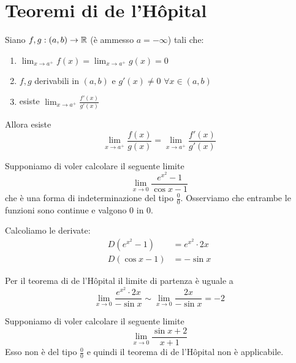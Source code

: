 \section{Teoremi di de l'Hôpital}

\begin{theorem}
Siano $f, g : (a,b) \to \mathbb R$ (è ammesso $a = -\infty$) tali che:
\begin{enumerate}
\item $\lim_{x \to a^+} f(x) = \lim_{x \to a^+} g(x) = 0$
\item $f,g$ derivabili in $(a,b)$ e $g'(x) \neq 0$ $\forall x \in (a,b)$
\item esiste $\lim_{x \to a^+} \frac{f'(x)}{g'(x)}$
\end{enumerate}

Allora esiste
\begin{equation*}
\lim_{x \to a^+} \frac{f(x)}{g(x)} = \lim_{x \to a^+} \frac{f'(x)}{g'(x)}
\end{equation*}
\end{theorem}

\begin{example}
Supponiamo di voler calcolare il seguente limite
\begin{equation*}
\lim_{x \to 0} \frac{e^{x^2}-1}{\cos x -1}
\end{equation*}
che è una forma di indeterminazione del tipo $\frac{0}{0}$. Osserviamo che entrambe le funzioni sono continue e valgono 0 in 0.

Calcoliamo le derivate:
\begin{align*}
D (e^{x^2}-1) &= e^{x^2} \cdot 2x \\
D (\cos x -1) &= -\sin x
\end{align*}

Per il teorema di de l'Hôpital il limite di partenza è uguale a
\begin{equation*}
\lim_{x \to 0} \frac{e^{x^2} \cdot 2x}{-\sin x} \sim \lim_{x \to 0} \frac{2x}{-\sin x} = -2
\end{equation*}
\end{example}

\begin{example}
Supponiamo di voler calcolare il seguente limite
\begin{equation*}
\lim_{x \to 0} \frac{\sin x + 2}{x+1}
\end{equation*}
Esso non è del tipo $\frac{0}{0}$ e quindi il teorema di de l'Hôpital non è applicabile.
\end{example}

